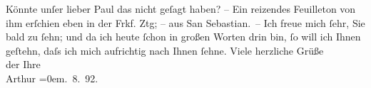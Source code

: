 \begin{ledgroupsized}[t]{13cm}
           \pstart
           Könnte unſer lieber Paul das nicht geſagt haben?
               – Ein reizendes Feuilleton von ihm erſchien eben
               in der Frkf. Ztg; – aus San Sebastian. –\pend
           \pstart
           Ich freue mich ſehr, Sie bald zu ſehn; und da ich heute ſchon in großen Worten drin
               bin, ſo will ich Ihnen geſtehn, daſs ich mich aufrichtig nach Ihnen ſehne.\pend
           \pstart
           {\pb} Viele herzliche Grüße{\\[\baselineskip]}der Ihre{\\[\baselineskip]}\spacefill\mbox{Arthur}\pend
           \leftskip=0em{}. 8. 92.\pend
           
         
         \endnumbering{}\end{ledgroupsized}  \newcommand{\dateiname}{L00116}\newcommand{\titel}{Arthur Schnitzler an Richard Beer-Hofmann, 22. 8. 1892}\newcommand{\editorInnen}{Martin Anton Müller und Gerd-Hermann Susen}
      